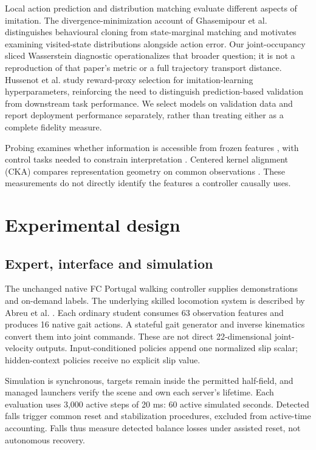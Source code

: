 \documentclass[conference]{IEEEtran}
\begin{document}
Local action prediction and distribution matching evaluate different aspects of imitation. The divergence-minimization account of Ghasemipour et al. \citep{ghasemipour2020} distinguishes behavioural cloning from state-marginal matching and motivates examining visited-state distributions alongside action error. Our joint-occupancy sliced Wasserstein diagnostic operationalizes that broader question; it is not a reproduction of that paper's metric or a full trajectory transport distance. Hussenot et al. \citep{hussenot2021} study reward-proxy selection for imitation-learning hyperparameters, reinforcing the need to distinguish prediction-based validation from downstream task performance. We select models on validation data and report deployment performance separately, rather than treating either as a complete fidelity measure.

Probing examines whether information is accessible from frozen features \citep{alain2016}, with control tasks needed to constrain interpretation \citep{hewitt2019}. Centered kernel alignment (CKA) compares representation geometry on common observations \citep{kornblith2019}. These measurements do not directly identify the features a controller causally uses.

\section{Experimental design}

\subsection{Expert, interface and simulation}

The unchanged native FC Portugal walking controller supplies demonstrations and on-demand labels. The underlying skilled locomotion system is described by Abreu et al. \citep{abreu2025}. Each ordinary student consumes 63 observation features and produces 16 native gait actions. A stateful gait generator and inverse kinematics convert them into joint commands. These are not direct 22-dimensional joint-velocity outputs. Input-conditioned policies append one normalized slip scalar; hidden-context policies receive no explicit slip value.

Simulation is synchronous, targets remain inside the permitted half-field, and managed launchers verify the scene and own each server's lifetime. Each evaluation uses 3,000 active steps of 20 ms: 60 active simulated seconds. Detected falls trigger common reset and stabilization procedures, excluded from active-time accounting. Falls thus measure detected balance losses under assisted reset, not autonomous recovery.
\end{document}

